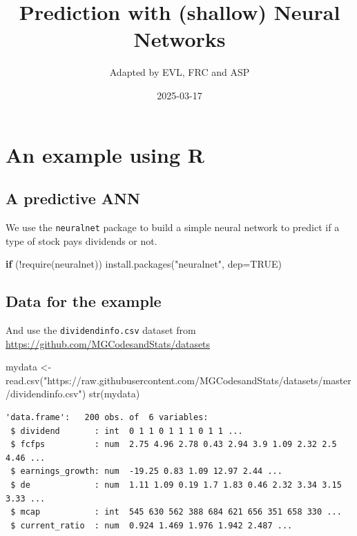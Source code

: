 \documentclass[
  letterpaper,
  DIV=11,
  numbers=noendperiod,
  oneside]{scrartcl}
\title{Prediction with (shallow) Neural Networks}
\author{Adapted by EVL, FRC and ASP}
\date{2025-03-17}
\newenvironment{Shaded}{\begin{snugshade}}{\end{snugshade}}
\newcommand{\AttributeTok}[1]{\textcolor[rgb]{0.40,0.45,0.13}{#1}}
\newcommand{\ConstantTok}[1]{\textcolor[rgb]{0.56,0.35,0.01}{#1}}
\newcommand{\ControlFlowTok}[1]{\textcolor[rgb]{0.00,0.23,0.31}{\textbf{#1}}}
\newcommand{\FunctionTok}[1]{\textcolor[rgb]{0.28,0.35,0.67}{#1}}
\newcommand{\NormalTok}[1]{\textcolor[rgb]{0.00,0.23,0.31}{#1}}
\newcommand{\OtherTok}[1]{\textcolor[rgb]{0.00,0.23,0.31}{#1}}
\newcommand{\SpecialCharTok}[1]{\textcolor[rgb]{0.37,0.37,0.37}{#1}}
\newcommand{\StringTok}[1]{\textcolor[rgb]{0.13,0.47,0.30}{#1}}
\begin{document}
\maketitle


\section{An example using R}\label{an-example-using-r}

\subsection{A predictive ANN}\label{a-predictive-ann}

We use the \texttt{neuralnet} package to build a simple neural network
to predict if a type of stock pays dividends or not.

\begin{Shaded}
\begin{Highlighting}[]
\ControlFlowTok{if}\NormalTok{ (}\SpecialCharTok{!}\FunctionTok{require}\NormalTok{(neuralnet)) }
  \FunctionTok{install.packages}\NormalTok{(}\StringTok{"neuralnet"}\NormalTok{, }\AttributeTok{dep=}\ConstantTok{TRUE}\NormalTok{)}
\end{Highlighting}
\end{Shaded}

\subsection{Data for the example}\label{data-for-the-example}

And use the \texttt{dividendinfo.csv} dataset from
\url{https://github.com/MGCodesandStats/datasets}

\begin{Shaded}
\begin{Highlighting}[]
\NormalTok{mydata }\OtherTok{\textless{}{-}} \FunctionTok{read.csv}\NormalTok{(}\StringTok{"https://raw.githubusercontent.com/MGCodesandStats/datasets/master/dividendinfo.csv"}\NormalTok{)}
\FunctionTok{str}\NormalTok{(mydata)}
\end{Highlighting}
\end{Shaded}

\begin{verbatim}
'data.frame':   200 obs. of  6 variables:
 $ dividend       : int  0 1 1 0 1 1 1 0 1 1 ...
 $ fcfps          : num  2.75 4.96 2.78 0.43 2.94 3.9 1.09 2.32 2.5 4.46 ...
 $ earnings_growth: num  -19.25 0.83 1.09 12.97 2.44 ...
 $ de             : num  1.11 1.09 0.19 1.7 1.83 0.46 2.32 3.34 3.15 3.33 ...
 $ mcap           : int  545 630 562 388 684 621 656 351 658 330 ...
 $ current_ratio  : num  0.924 1.469 1.976 1.942 2.487 ...
\end{verbatim}
\end{document}
